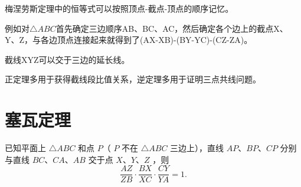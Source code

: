 \begin{remark}
    梅涅劳斯定理中的恒等式可以按照顶点-截点-顶点的顺序记忆。
    
    例如对$\triangle ABC$首先确定三边顺序AB、BC、AC，然后确定各个边上的截点X、Y、Z，与各边顶点连接起来就得到了(AX-XB)-(BY-YC)-(CZ-ZA)。

    截线XYZ可以交于三边的延长线。

    正定理多用于获得截线段比值关系，逆定理多用于证明三点共线问题。
\end{remark}


\section{塞瓦定理}
\begin{theorem}[塞瓦(Ceva)定理]
    已知平面上 $\triangle A B C$ 和点 $P$（ $P$ 不在 $\triangle A B C$ 三边上），直线 $A P 、 B P 、 C P$ 分别与直线 $B C 、 C A 、 A B$ 交于点 $X 、 Y 、 Z$ ，则 
    $$\frac{A Z}{Z B} \cdot \frac{B X}{X C} \cdot \frac{C Y}{Y A}=1.$$
\end{theorem}


